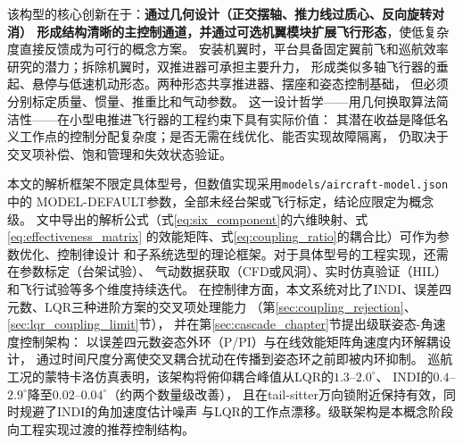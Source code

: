 该构型的核心创新在于：\textbf{通过几何设计（正交摆轴、推力线过质心、反向旋转对消）
形成结构清晰的主控制通道，并通过可选机翼模块扩展飞行形态}，使低复杂度直接反馈成为可行的概念方案。
安装机翼时，平台具备固定翼前飞和巡航效率研究的潜力；拆除机翼时，双推进器可承担主要升力，
形成类似多轴飞行器的垂起、悬停与低速机动形态。两种形态共享推进器、摆座和姿态控制基础，
但必须分别标定质量、惯量、推重比和气动参数。
这一设计哲学——用几何换取算法简洁性——在小型电推进飞行器的工程约束下具有实际价值：
其潜在收益是降低名义工作点的控制分配复杂度；是否无需在线优化、能否实现故障隔离，
仍取决于交叉项补偿、饱和管理和失效状态验证。

本文的解析框架不限定具体型号，但数值实现采用\texttt{models/aircraft-model.json}中的
MODEL-DEFAULT参数，全部未经台架或飞行标定，结论应限定为概念级。
文中导出的解析公式（式\ref{eq:six_component}的六维映射、式\ref{eq:effectiveness_matrix}
的效能矩阵、式\ref{eq:coupling_ratio}的耦合比）可作为参数优化、控制律设计
和子系统选型的理论框架。对于具体型号的工程实现，还需在参数标定（台架试验）、
气动数据获取（CFD或风洞）、实时仿真验证（HIL）和飞行试验等多个维度持续迭代。
在控制律方面，本文系统对比了INDI、误差四元数、LQR三种进阶方案的交叉项处理能力
（第\ref{sec:coupling_rejection}、\ref{sec:lqr_coupling_limit}节），
并在第\ref{sec:cascade_chapter}节提出级联姿态-角速度控制架构：
以误差四元数姿态外环（P/PI）与在线效能矩阵角速度内环解耦设计，
通过时间尺度分离使交叉耦合扰动在传播到姿态环之前即被内环抑制。
巡航工况的蒙特卡洛仿真表明，该架构将俯仰耦合峰值从LQR的$1.3$--$2.0^\circ$、
INDI的$0.4$--$2.9^\circ$降至$0.02$--$0.04^\circ$（约两个数量级改善），
且在tail-sitter万向锁附近保持有效，同时规避了INDI的角加速度估计噪声
与LQR的工作点漂移。级联架构是本概念阶段向工程实现过渡的推荐控制结构。
